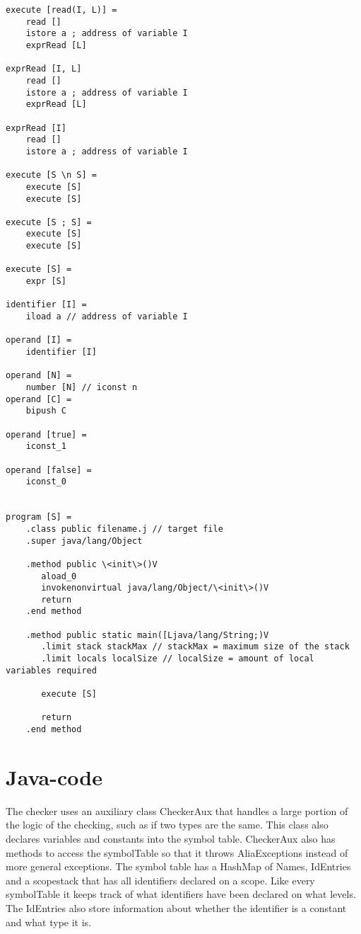 \documentclass[paper=a4, fontsize=11pt]{article}
\numberwithin{equation}{section}		%
\numberwithin{figure}{section}			%
\numberwithin{table}{section}				%
\begin{document}
\begin{verbatim}
execute [read(I, L)] =
    read []
    istore a ; address of variable I
    exprRead [L]
    
exprRead [I, L]
    read []
    istore a ; address of variable I
    exprRead [L]
    
exprRead [I]
    read []
    istore a ; address of variable I

execute [S \n S] =
    execute [S]
    execute [S]
    
execute [S ; S] =
    execute [S]
    execute [S]

execute [S] =
    expr [S]
    
identifier [I] =
    iload a // address of variable I

operand [I] =
    identifier [I]

operand [N] =
    number [N] // iconst n
operand [C] =
    bipush C

operand [true] =
    iconst_1

operand [false] =
    iconst_0


program [S] =
    .class public filename.j // target file
    .super java/lang/Object
    
    .method public \<init\>()V
       aload_0
       invokenonvirtual java/lang/Object/\<init\>()V
       return
    .end method
    
    .method public static main([Ljava/lang/String;)V
       .limit stack stackMax // stackMax = maximum size of the stack
       .limit locals localSize // localSize = amount of local variables required
       
       execute [S]
    
       return
    .end method
\end{verbatim}

\section{Java-code}
The checker uses an auxiliary class CheckerAux that handles a large portion of the logic of the checking, such as if two types are the same. This class also declares variables and constants into the symbol table. CheckerAux also has methods to access the symbolTable so that it throws AliaExceptions instead of more general exceptions. The symbol table has a HashMap of Names, IdEntries and a scopestack that has all identifiers declared on a scope. Like every symbolTable it keeps track of what identifiers have been declared on what levels. The IdEntries also store information about whether the identifier is a constant and what type it is.
\end{document}
